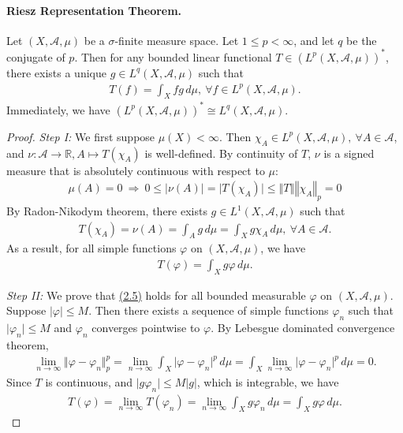 \documentclass{article}
\begin{document}
\paragraph{Riesz Representation Theorem.} Let $(X,\mathscr{A},\mu)$ be a $\sigma$-finite measure space. Let $1\leq p<\infty$, and let $q$ be the conjugate of $p$. Then for any bounded linear functional $T\in(L^p(X,\mathscr{A},\mu))^*$, there exists a unique $g\in L^q(X,\mathscr{A},\mu)$ such that
\begin{align*}
	T(f) = \int_X fg\, d\mu,\ \forall f\in L^p(X,\mathscr{A},\mu).
\end{align*}
Immediately, we have $(L^p(X,\mathscr{A},\mu))^*\cong L^q(X,\mathscr{A},\mu)$.
\begin{proof}
\textit{Step I:} We first suppose $\mu(X)<\infty$. Then $\chi_A\in L^p(X,\mathscr{A},\mu),\ \forall A\in\mathscr{A}$, and
$\nu:\mathscr{A}\to\mathbb{R},A\mapsto T(\chi_A)$ is well-defined. By continuity of $T$, $\nu$ is a signed measure that is absolutely continuous with respect to $\mu$:
\begin{align*}
	\mu(A)=0\ \Rightarrow\ 0\leq\vert \nu(A)\vert=\vert T(\chi_A)\vert\leq\left\Vert T\right\Vert\left\Vert\chi_A\right\Vert_p = 0
\end{align*}
By Radon-Nikodym theorem, there exists $g\in L^1(X,\mathscr{A},\mu)$ such that
\begin{align*}
T(\chi_A) = \nu(A) = \int_A g\,d\mu = \int_X g\chi_A\,d\mu,\ \forall A\in\mathscr{A}.
\end{align*}
As a result, for all simple functions $\varphi$ on $(X,\mathscr{A},\mu)$, we have
\begin{align*}
	T(\varphi) = \int_X g\varphi\,d\mu.\tag{2.5}\label{eq:2.5}
\end{align*}

\textit{Step II:} We prove that \hyperref[eq:2.5]{(2.5)} holds for all bounded measurable $\varphi$ on $(X,\mathscr{A},\mu)$. Suppose $\vert\varphi\vert\leq M$. Then there exists a sequence of simple functions $\varphi_n$ such that $\vert\varphi_n\vert\leq M$ and $\varphi_n$ converges pointwise to $\varphi$. By Lebesgue dominated convergence theorem,
\begin{align*}
	\lim_{n\to\infty}\Vert\varphi-\varphi_n\Vert_p^p = \lim_{n\to\infty}\int_X\vert\varphi-\varphi_n\vert^p\,d\mu  = \int_X\lim_{n\to\infty}\vert\varphi-\varphi_n\vert^p\,d\mu = 0.
\end{align*}
Since $T$ is continuous, and $\vert g\varphi_n\vert \leq M\vert g\vert$, which is integrable, we have
\begin{align*}
	T(\varphi) = \lim_{n\to\infty} T(\varphi_n) = \lim_{n\to\infty}\int_X g\varphi_n\,d\mu = \int_X g\varphi\,d\mu.
\end{align*}


\end{proof}
\end{document}
